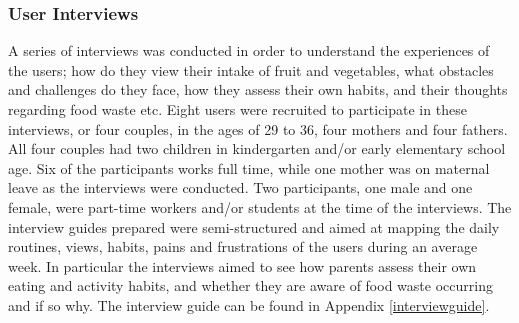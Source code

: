 \vspace{2,5mm} %

    \subsubsection{User Interviews}
        \label{userinterview}
    A series of interviews was conducted in order to understand the experiences of the users; how do they view their intake of fruit and vegetables, what obstacles and challenges do they face, how they assess their own habits, and their thoughts regarding food waste etc. Eight users were recruited to participate in these interviews, or four couples, in the ages of 29 to 36, four mothers and four fathers. All four couples had two children in kindergarten and/or early elementary school age. Six of the participants works full time, while one mother was on maternal leave as the interviews were conducted. Two participants, one male and one female, were part-time workers and/or students at the time of the interviews. The interview guides prepared were semi-structured and aimed at mapping the daily routines, views, habits, pains and frustrations of the users during an average week. In particular the interviews aimed to see how parents assess their own eating and activity habits, and whether they are aware of food waste occurring and if so why. The interview guide can be found in Appendix \ref{interviewguide}. 
  
\vspace{2,5mm} %


